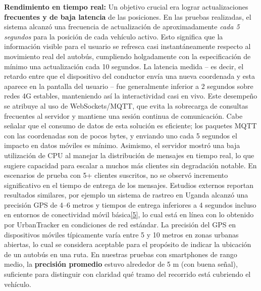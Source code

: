 \documentclass[
]{article}
\begin{document}
\textbf{Rendimiento en tiempo real:} Un objetivo crucial era lograr
actualizaciones \textbf{frecuentes y de baja latencia} de las
posiciones. En las pruebas realizadas, el sistema alcanzó una frecuencia
de actualización de aproximadamente \emph{cada 5 segundos} para la
posición de cada vehículo activo. Esto significa que la información
visible para el usuario se refresca casi instantáneamente respecto al
movimiento real del autobús, cumpliendo holgadamente con la
especificación de mínimo una actualización cada 10 segundos. La latencia
medida -- es decir, el retardo entre que el dispositivo del conductor
envía una nueva coordenada y esta aparece en la pantalla del usuario --
fue generalmente inferior a 2 segundos sobre redes 4G estables,
manteniendo así la interactividad casi en vivo. Este desempeño se
atribuye al uso de WebSockets/MQTT, que evita la sobrecarga de consultas
frecuentes al servidor y mantiene una sesión continua de comunicación.
Cabe señalar que el consumo de datos de esta solución es eficiente; los
paquetes MQTT con las coordenadas son de pocos bytes, y enviando uno
cada 5 segundos el impacto en datos móviles es mínimo. Asimismo, el
servidor mostró una baja utilización de CPU al manejar la distribución
de mensajes en tiempo real, lo que sugiere capacidad para escalar a
muchos más clientes sin degradación notable. En escenarios de prueba con
5+ clientes suscritos, no se observó incremento significativo en el
tiempo de entrega de los mensajes. Estudios externos reportan resultados
similares, por ejemplo un sistema de rastreo en Uganda alcanzó una
precisión GPS de 4--6 metros y tiempos de entrega inferiores a 4
segundos incluso en entornos de conectividad móvil
básica\href{https://fliphtml5.com/lqsof/cdpg/Art\%C3\%ADculos/\#:~:text=sistema,a\%206\%20metros\%2C\%20una\%20latencia}{{[}5{]}},
lo cual está en línea con lo obtenido por UrbanTracker en condiciones de
red estándar. La precisión del GPS en dispositivos móviles típicamente
varía entre 5 y 10 metros en zonas urbanas abiertas, lo cual se
considera aceptable para el propósito de indicar la ubicación de un
autobús en una ruta. En nuestras pruebas con smartphones de rango medio,
la \textbf{precisión promedio} estuvo alrededor de 5 m (con buena
señal), suficiente para distinguir con claridad qué tramo del recorrido
está cubriendo el vehículo.
\end{document}
